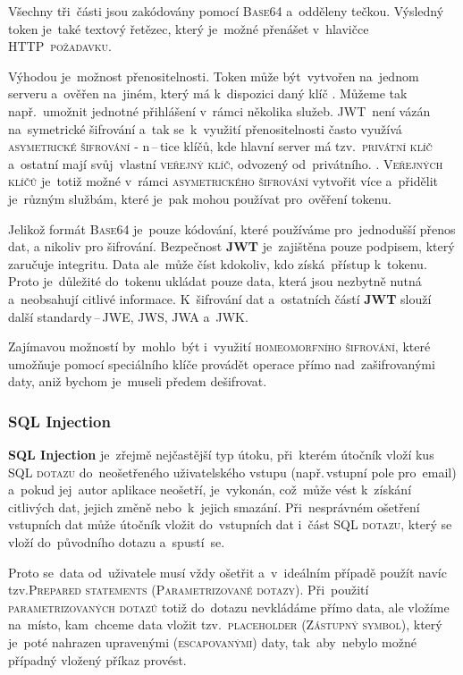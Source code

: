 \documentclass[14pt,a4paper]{article}
\begin{document}
            Všechny tři~části jsou zakódovány pomocí \textsc{Base64} a~odděleny tečkou. Výsledný token je~také textový řetězec, který je~možné přenášet v~hlavičce \textsc{HTTP~požadavku}.

            Výhodou je~možnost přenositelnosti. Token může být~vytvořen na~jednom serveru a~ověřen na~jiném, který má k~dispozici daný klíč \parencite{ieee:jwt}. Můžeme tak např.~umožnit jednotné přihlášení v~rámci několika služeb. JWT~není vázán na~symetrické šifrování a~tak se~k~využití přenositelnosti často využívá \textsc{asymetrické šifrování} - n\,--\,tice klíčů, kde hlavní server má tzv.~\textsc{privátní klíč} a~ostatní mají svůj~vlastní \textsc{veřejný klíč}, odvozený od~privátního. \parencite{miguelgrinbergJSONTokens}. \textsc{Veřejných klíčů} je~totiž možné v~rámci \textsc{asymetrického šifrování} vytvořit více a~přidělit je~různým službám, které je~pak mohou používat pro~ověření tokenu.

            Jelikož formát \textsc{Base64} je~pouze kódování, které používáme pro~jednodušší přenos dat, a nikoliv pro šifrování. Bezpečnost \textbf{JWT} je~zajištěna pouze podpisem, který zaručuje integritu. Data ale~může číst kdokoliv, kdo získá~přístup k~tokenu. Proto je~důležité do~tokenu ukládat pouze data, která jsou nezbytně nutná a~neobsahují citlivé informace. K~šifrování dat a~ostatních částí \textbf{JWT} slouží další standardy\,--\,\textsc{JWE}, \textsc{JWS}, \textsc{JWA} a~\textsc{JWK}. \parencite{jwtesak}

            Zajímavou možností by~mohlo~být i~využití \textsc{homeomorfního šifrování}, které umožňuje pomocí speciálního klíče provádět operace přímo nad~zašifrovanými daty, aniž bychom je~museli předem dešifrovat. \parencite{homeomorphicEncryption}

            \subsubsection{SQL Injection}
            \textbf{SQL Injection} je~zřejmě nejčastější typ útoku, při~kterém útočník vloží kus \textsc{SQL dotazu} do~neošetřeného uživatelského vstupu (např.\,vstupní pole pro~email) a~pokud jej~autor aplikace neošetří, je~vykonán, což~může vést k~získání citlivých dat, jejich změně nebo~k~jejich smazání.
            Při~nesprávném ošetření vstupních dat může útočník vložit do~vstupních dat i~část \textsc{SQL dotazu}, který se vloží do~původního dotazu a~spustí~se.

            Proto se~data od~uživatele musí vždy ošetřit a~v~ideálním případě použít navíc tzv.\textsc{Prepared statements} (\textsc{Parametrizované dotazy}).
            Při~použití \textsc{parametrizovaných dotazů} totiž do~dotazu nevkládáme přímo data, ale vložíme na~místo, kam~chceme data vložit tzv.~\textsc{placeholder} (\textsc{Zástupný symbol}), který je~poté nahrazen upravenými (\textsc{escapovanými}) daty, tak~aby~nebylo možné případný vložený příkaz provést.
            
\end{document}
